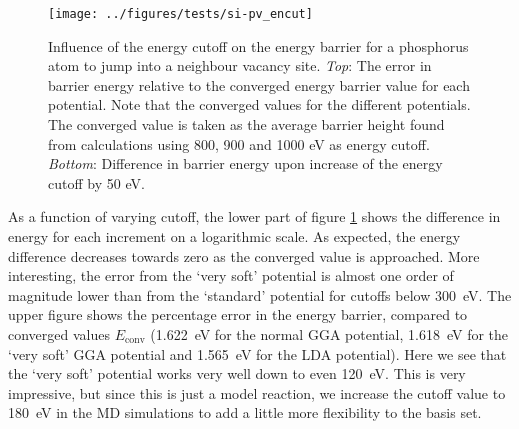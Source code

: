 \documentclass[11pt,bibliography=totoc,index=totoc]{scrbook}   %
\begin{document}
\begin{figure}[htbp]
  \begin{center}
    \texttt{[image: ../figures/tests/si-pv\_encut]}
  \end{center}
  \caption{Influence of the energy cutoff on the energy barrier for a phosphorus atom to jump into a neighbour vacancy site. 
  \textit{Top}: The error in barrier energy relative to the converged energy barrier value for each potential. 
  Note that the converged values for the different potentials.
  The converged value is taken as the average barrier height found from calculations using 800, 900 and 1000 eV as energy cutoff.
  \textit{Bottom}: Difference in barrier energy upon increase of the energy cutoff by 50 eV.}
  \label{fig:tests/si-pv_encut}
\end{figure}

As a function of varying cutoff, the lower part of figure \ref{fig:tests/si-pv_encut} shows the difference in energy for each increment on a logarithmic scale. 
As expected, the energy difference decreases towards zero as the converged value is approached.
More interesting, the error from the `very soft' potential is almost one order of magnitude lower than from the `standard' potential for cutoffs below 300~eV.
The upper figure shows the percentage error in the energy barrier, compared to converged values $E_{\text{conv}}$ (1.622~eV for the normal GGA potential, 1.618~eV for the `very soft' GGA potential and 1.565~eV for the LDA potential).
Here we see that the `very soft' potential works very well down to even 120~eV.
This is very impressive, but since this is just a model reaction, we increase the cutoff value to 180~eV in the MD simulations to add a little more flexibility to the basis set.




\end{document}
